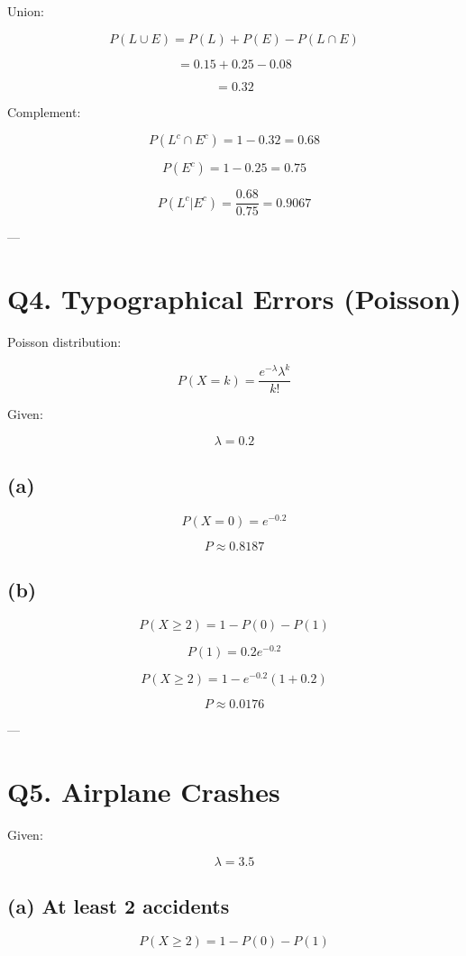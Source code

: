 \documentclass[12pt]{article}
\begin{document}
Union:

\[
P(L \cup E) = P(L) + P(E) - P(L \cap E)
\]

\[
= 0.15 + 0.25 - 0.08
\]

\[
= 0.32
\]

Complement:

\[
P(L^c \cap E^c) = 1 - 0.32 = 0.68
\]

\[
P(E^c) = 1 - 0.25 = 0.75
\]

\[
P(L^c | E^c) = \frac{0.68}{0.75} = 0.9067
\]

---
\newpage
\section*{Q4. Typographical Errors (Poisson)}

Poisson distribution:

\[
P(X = k) = \frac{e^{-\lambda} \lambda^k}{k!}
\]

Given:

\[
\lambda = 0.2
\]

\subsection*{(a)}

\[
P(X=0) = e^{-0.2}
\]

\[
P \approx 0.8187
\]

\subsection*{(b)}

\[
P(X \ge 2) = 1 - P(0) - P(1)
\]

\[
P(1) = 0.2 e^{-0.2}
\]

\[
P(X \ge 2) = 1 - e^{-0.2}(1 + 0.2)
\]

\[
P \approx 0.0176
\]

---
\newpage
\section*{Q5. Airplane Crashes}

Given:

\[
\lambda = 3.5
\]

\subsection*{(a) At least 2 accidents}

\[
P(X \ge 2) = 1 - P(0) - P(1)
\]
\end{document}
